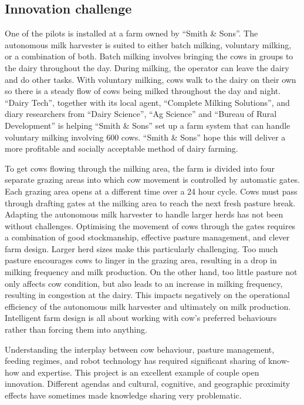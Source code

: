 \subsection{Innovation challenge}

One of the pilots is installed at a farm owned by \enquote{Smith \& Sons}. The autonomous milk harvester is suited to either batch milking, voluntary milking, or a combination of both. Batch milking involves bringing the cows in groups to the dairy throughout the day. During milking, the operator can leave the dairy and do other tasks. With voluntary milking, cows walk to the dairy on their own so there is a steady flow of cows being milked throughout the day and night. \enquote{Dairy Tech}, together with its local agent, \enquote{Complete Milking Solutions}, and diary researchers from \enquote{Dairy Science}, \enquote{Ag Science} and \enquote{Bureau of Rural Development} is helping \enquote{Smith & Sons} set up a farm system that can handle voluntary milking involving 600 cows. \enquote{Smith \& Sons} hope this will deliver a more profitable and socially acceptable method of dairy farming. \medskip

To get cows flowing through the milking area, the farm is divided into four separate grazing areas into which cow movement is controlled by automatic gates. Each grazing area opens at a different time over a 24 hour cycle. Cows must pass through drafting gates at the milking area to reach the next fresh pasture break. Adapting the autonomous milk harvester to handle larger herds has not been without challenges. Optimising the movement of cows through the gates requires a combination of good stockmanship, effective pasture management, and clever farm design. Larger herd sizes make this particularly challenging. Too much pasture encourages cows to linger in the grazing area, resulting in a drop in milking frequency and milk production. On the other hand, too little pasture not only affects cow condition, but also leads to an increase in milking frequency, resulting in congestion at the dairy. This impacts negatively on the operational efficiency of the autonomous milk harvester and ultimately on milk production. Intelligent farm design is all about working with cow's preferred behaviours rather than forcing them into anything. \medskip

Understanding the interplay between cow behaviour, pasture management, feeding regimes, and robot technology has required significant sharing of know-how and expertise. This project is an excellent example of couple open innovation. Different agendas and cultural, cognitive, and geographic proximity effects have sometimes made knowledge sharing very problematic. \medskip

